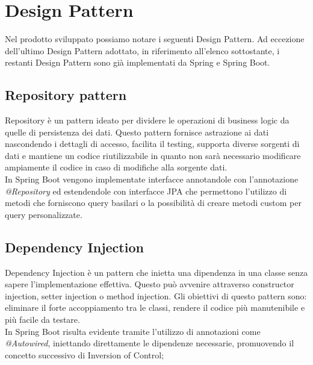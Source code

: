 \section{Design Pattern}
\label{cap:design pattern}
Nel prodotto sviluppato possiamo notare i seguenti Design Pattern.
Ad eccezione dell'ultimo Design Pattern adottato, in riferimento all'elenco sottostante, i restanti Design Pattern sono già implementati da Spring e Spring Boot.
\subsection*{Repository pattern}
Repository è un pattern ideato per dividere le operazioni di business logic da quelle di persistenza dei dati. Questo pattern fornisce astrazione ai dati nascondendo i dettagli di accesso, facilita il testing, supporta diverse sorgenti di dati e mantiene un codice riutilizzabile in quanto non sarà necessario modificare ampiamente il codice in caso di modifiche alla sorgente dati.\\
In Spring Boot vengono implementate interfacce annotandole con  l'annotazione \textit{@Repository} ed estendendole con interfacce JPA che permettono l'utilizzo di metodi che forniscono query basilari o la possibilità di creare metodi custom per query personalizzate.
\subsection*{Dependency Injection}
Dependency Injection è un pattern che inietta una dipendenza in una classe senza sapere l'implementazione effettiva. Questo può avvenire attraverso constructor injection, setter injection o method injection. Gli obiettivi di questo pattern sono: eliminare il forte accoppiamento tra le classi, rendere il codice più manutenibile e più facile da testare.\\
In Spring Boot risulta evidente tramite l'utilizzo di annotazioni come \textit{@Autowired}, iniettando direttamente le dipendenze necessarie, promuovendo il concetto successivo di Inversion of Control;
